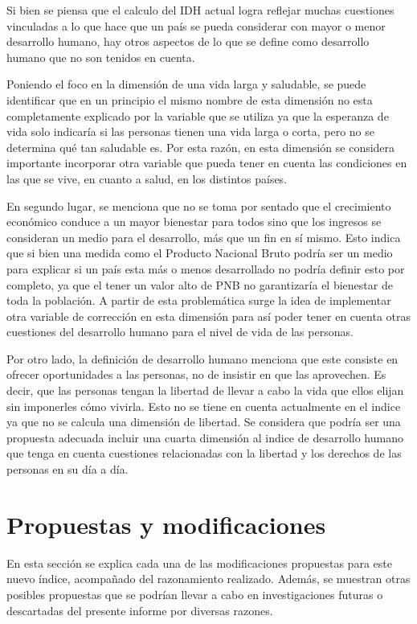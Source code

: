 \documentclass[
  10pt,
]{article}
\begin{document}
Si bien se piensa que el calculo del IDH actual logra reflejar muchas
cuestiones vinculadas a lo que hace que un país se pueda considerar con
mayor o menor desarrollo humano, hay otros aspectos de lo que se define
como desarrollo humano que no son tenidos en cuenta.

Poniendo el foco en la dimensión de una vida larga y saludable, se puede
identificar que en un principio el mismo nombre de esta dimensión no
esta completamente explicado por la variable que se utiliza ya que la
esperanza de vida solo indicaría si las personas tienen una vida larga o
corta, pero no se determina qué tan saludable es. Por esta razón, en
esta dimensión se considera importante incorporar otra variable que
pueda tener en cuenta las condiciones en las que se vive, en cuanto a
salud, en los distintos países.

En segundo lugar, se menciona que no se toma por sentado que el
crecimiento económico conduce a un mayor bienestar para todos sino que
los ingresos se consideran un medio para el desarrollo, más que un fin
en sí mismo. Esto indica que si bien una medida como el Producto
Nacional Bruto podría ser un medio para explicar si un país esta más o
menos desarrollado no podría definir esto por completo, ya que el tener
un valor alto de PNB no garantizaría el bienestar de toda la población.
A partir de esta problemática surge la idea de implementar otra variable
de corrección en esta dimensión para así poder tener en cuenta otras
cuestiones del desarrollo humano para el nivel de vida de las personas.

Por otro lado, la definición de desarrollo humano menciona que este
consiste en ofrecer oportunidades a las personas, no de insistir en que
las aprovechen. Es decir, que las personas tengan la libertad de llevar
a cabo la vida que ellos elijan sin imponerles cómo vivirla. Esto no se
tiene en cuenta actualmente en el indice ya que no se calcula una
dimensión de libertad. Se considera que podría ser una propuesta
adecuada incluir una cuarta dimensión al indice de desarrollo humano que
tenga en cuenta cuestiones relacionadas con la libertad y los derechos
de las personas en su día a día.

\section{Propuestas y modificaciones}\label{propuestas-y-modificaciones}

En esta sección se explica cada una de las modificaciones propuestas
para este nuevo índice, acompañado del razonamiento realizado. Además,
se muestran otras posibles propuestas que se podrían llevar a cabo en
investigaciones futuras o descartadas del presente informe por diversas
razones.
\end{document}
